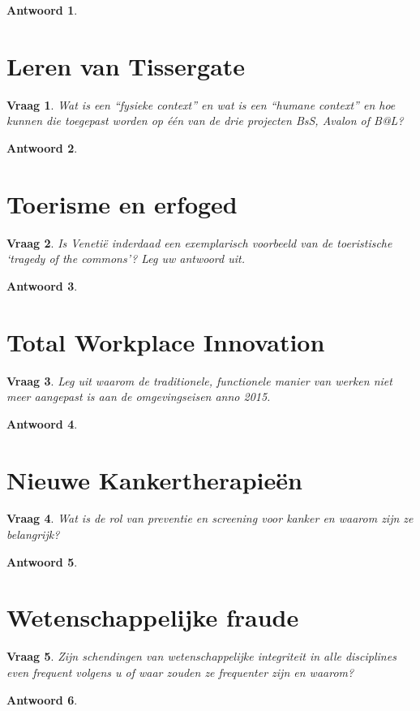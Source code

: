 \documentclass{article}
\theoremstyle{plain}
\newtheorem{question}{Vraag}
\theoremstyle{nonumberplain}
\newtheorem{answer}{Antwoord}
\begin{document}
\begin{answer}

\end{answer}

\section{Leren van Tissergate}

\begin{question}
Wat is een “fysieke context” en wat is een “humane context” en hoe kunnen die
toegepast worden op één van de drie projecten BsS, Avalon of B@L?
\end{question}

\begin{answer}

\end{answer}

\section{Toerisme en erfoged}

\begin{question}
Is Venetië inderdaad een exemplarisch voorbeeld van de toeristische ‘tragedy of
the commons’? Leg uw antwoord uit.
\end{question}

\begin{answer}

\end{answer}

\section{Total Workplace Innovation}

\begin{question}
Leg uit waarom de traditionele, functionele manier van werken niet meer
aangepast is aan de omgevingseisen anno 2015.
\end{question}

\begin{answer}

\end{answer}

\section{Nieuwe Kankertherapieën}

\begin{question}
Wat is de rol van preventie en screening voor kanker en waarom zijn ze
belangrijk?
\end{question}

\begin{answer}

\end{answer}

\section{Wetenschappelijke fraude}

\begin{question}
Zijn schendingen van wetenschappelijke integriteit in alle disciplines even
frequent volgens u of waar zouden ze frequenter zijn en waarom?
\end{question}

\begin{answer}

\end{answer}
\end{document}
